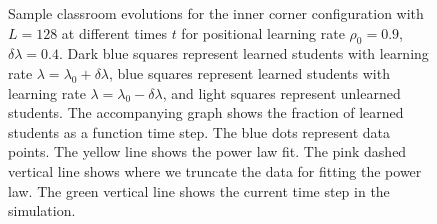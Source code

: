 \begin{figure}[htbp!]
   \caption{Sample classroom evolutions for the inner corner configuration with $L=128$ at different times $t$ for positional learning rate $\rho_0=0.9$, $\delta\lambda = 0.4$.
   Dark blue squares represent learned students with learning rate $\lambda = \lambda_0 + \delta\lambda$, blue squares represent learned students with learning rate $\lambda = \lambda_0 - \delta\lambda$, and light squares represent unlearned students.
   The accompanying graph shows the fraction of learned students as a function time step.
   The blue dots represent data points. 
   The yellow line shows the power law fit.
   The pink dashed vertical line shows where we truncate the data for fitting the power law.
   The green vertical line shows the current time step in the simulation.
    }
    \label{fig:2DBPCAIH sample class evolution high rho high delta}
 \end{figure}

